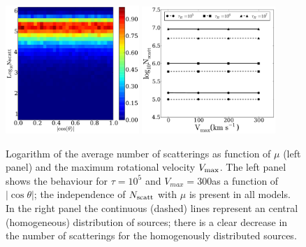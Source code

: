 \documentclass{emulateapj}
\newcommand{\kms}{{\ifmmode{{\mathrm{\,km\ s}^{-1}}}\else{\,km~s$^{-1}$}\fi}}
\begin{document}
\begin{figure}
\begin{center}
    \includegraphics[width=0.45\textwidth]{f12.pdf}
    \includegraphics[width=0.45\textwidth]{f13.pdf}
\end{center}
\caption{Logarithm of the average number of scatterings as function of
  $\mu$ (left panel) and the maximum rotational velocity $V_{\rm
max}$. The left panel shows the behaviour for $\tau=10^{5}$ and
  $V_{max}=300$\kms as a function of $|\cos\theta|$; the independence of
  $N_{\rm scatt}$ with $\mu$ is present in all models.
  In the right panel the continuous (dashed) lines represent an
  central (homogeneous) distribution of sources; there is a clear
  decrease in the number of scatterings for the homogenously
  distributed sources.
\label{fig:Nscatt} }
\end{figure}



\end{document}
